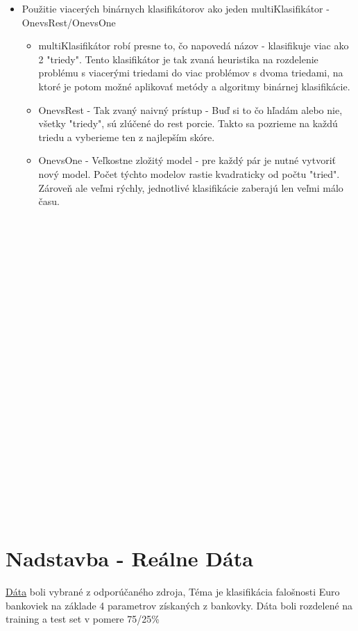 \documentclass{article}
\begin{document}
\begin{itemize}
\begin{itemize}
        \end{itemize}
    
    \begin{itemize}
    
    \end{itemize}
    
    \item Použitie viacerých binárnych klasifikátorov ako jeden multiKlasifikátor - OnevsRest/OnevsOne
    \begin{itemize}
        \item multiKlasifikátor robí presne to, čo napovedá názov - klasifikuje viac ako 2 "triedy". Tento klasifikátor je tak zvaná heuristika na rozdelenie problému s viacerými triedami do viac problémov s dvoma triedami, na ktoré je potom možné aplikovať metódy a algoritmy binárnej klasifikácie.
        \item OnevsRest - Tak zvaný naivný prístup - Buď si to čo hľadám alebo nie, všetky "triedy", sú zlúčené do rest porcie. Takto sa pozrieme na každú triedu a vyberieme ten z najlepším skóre. 
        \item OnevsOne - Veľkostne zložitý model - pre každý pár je nutné vytvoriť nový model. Počet týchto modelov rastie kvadraticky od počtu "tried". Zároveň ale veľmi rýchly, jednotlivé klasifikácie zaberajú len veľmi málo času. 
    \end{itemize}
\end{itemize}
\\\\\\\\\\\\\\\
\\\\\\\\\\\\\\\
\\\\\\\\\\\\\\\
\section{Nadstavba - Reálne Dáta}
\href{https://archive.ics.uci.edu/ml/datasets/banknote+authentication}{Dáta} boli vybrané z odporúčaného zdroja, Téma je klasifikácia falošnosti Euro bankoviek na základe 4 parametrov získaných z bankovky. Dáta boli rozdelené na training a test set v pomere 75/25\%
\end{document}
